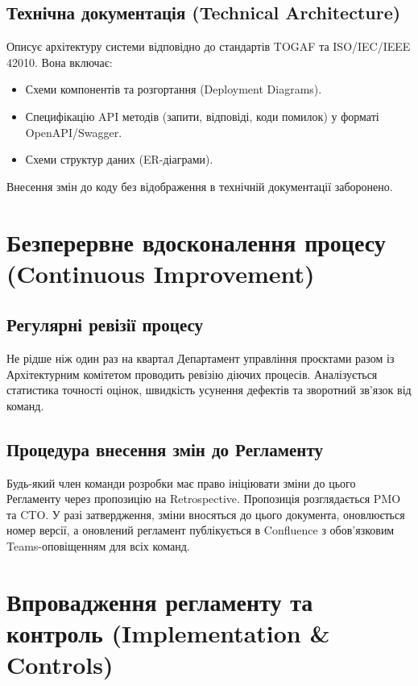 \documentclass{article}
\begin{document}
\subsection{Технічна документація (Technical Architecture)}
Описує архітектуру системи відповідно до стандартів TOGAF та ISO/IEC/IEEE 42010. Вона включає:
\begin{itemize}
    \item Схеми компонентів та розгортання (Deployment Diagrams).
    \item Специфікацію API методів (запити, відповіді, коди помилок) у форматі OpenAPI/Swagger.
    \item Схеми структур даних (ER-діаграми).
\end{itemize}
Внесення змін до коду без відображення в технічній документації заборонено.

\section{Безперервне вдосконалення процесу (Continuous Improvement)}

\subsection{Регулярні ревізії процесу}
Не рідше ніж один раз на квартал Департамент управління проєктами разом із Архітектурним комітетом проводить ревізію діючих процесів. Аналізується статистика точності оцінок, швидкість усунення дефектів та зворотний зв'язок від команд.

\subsection{Процедура внесення змін до Регламенту}
Будь-який член команди розробки має право ініціювати зміни до цього Регламенту через пропозицію на Retrospective. Пропозиція розглядається PMO та CTO. У разі затвердження, зміни вносяться до цього документа, оновлюється номер версії, а оновлений регламент публікується в Confluence з обов'язковим Teams-оповіщенням для всіх команд.

\section{Впровадження регламенту та контроль (Implementation \& Controls)}
\end{document}
